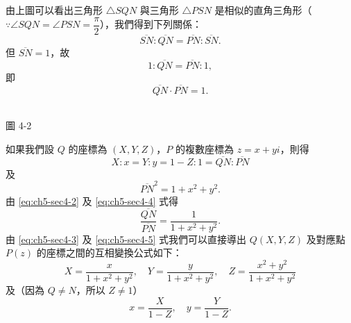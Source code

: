 \begin{center}
\begin{minipage}{0.5\textwidth}
由上圖可以看出三角形 $\triangle SQN$ 與三角形 $\triangle PSN$ 是相似的直角三角形（$\because \angle SQN = \angle PSN = \dfrac{\pi}{2}$），我們得到下列關係：
\[
\overline{SN} : \overline{QN} = \overline{PN} : \overline{SN}.
\]
但 $\overline{SN}=1$，故
\[
1 : \overline{QN} = \overline{PN} : 1,
\]
即
\begin{equation}
\overline{QN}\cdot\overline{PN} = 1. \label{eq:ch5-sec4-2}
\end{equation}
\end{minipage}
\hfill
\begin{minipage}{0.45\textwidth}
\centering
{}
\\[5pt]
\small 圖 4-2
\end{minipage}
\end{center}

如果我們設 $Q$ 的座標為 $(X, Y, Z)$，$P$ 的複數座標為 $z=x+yi$，則得
\begin{equation}
X:x = Y:y = 1-Z:1 = \overline{QN}:\overline{PN} \label{eq:ch5-sec4-3}
\end{equation}
及
\begin{equation}
\overline{PN}^2 = 1+x^2+y^2. \label{eq:ch5-sec4-4}
\end{equation}
由 \eqref{eq:ch5-sec4-2} 及 \eqref{eq:ch5-sec4-4} 式得
\begin{equation}
\frac{\overline{QN}}{\overline{PN}} = \frac{1}{1+x^2+y^2}. \label{eq:ch5-sec4-5}
\end{equation}
由 \eqref{eq:ch5-sec4-3} 及 \eqref{eq:ch5-sec4-5} 式我們可以直接導出 $Q(X, Y, Z)$ 及對應點 $P(z)$ 的座標之間的互相變換公式如下：
\begin{equation}
X = \frac{x}{1+x^2+y^2}, \quad Y = \frac{y}{1+x^2+y^2}, \quad Z = \frac{x^2+y^2}{1+x^2+y^2} \label{eq:ch5-sec4-6}
\end{equation}
及（因為 $Q \neq N$，所以 $Z \neq 1$）
\begin{equation}
x = \frac{X}{1-Z}, \quad y = \frac{Y}{1-Z}. \label{eq:ch5-sec4-7}
\end{equation}

